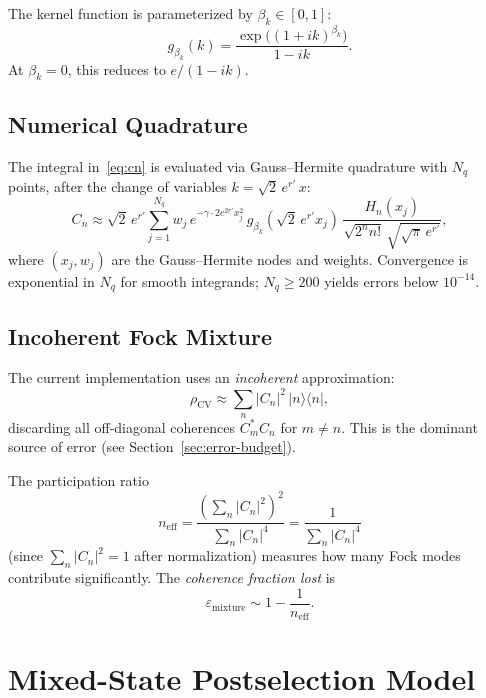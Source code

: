 \documentclass[11pt]{article}
\newcommand{\ket}[1]{|{#1}\rangle}
\newcommand{\bra}[1]{\langle{#1}|}
\newcommand{\eps}{\varepsilon}
\begin{document}
The kernel function is parameterized by $\beta_k\in[0,1]$:
\begin{equation}\label{eq:kernel}
g_{\beta_k}(k) = \frac{\exp\!\big((1+ik)^{\beta_k}\big)}{1-ik}.
\end{equation}
At $\beta_k=0$, this reduces to $e/(1-ik)$.

\subsection{Numerical Quadrature}
The integral in~\eqref{eq:cn} is evaluated via Gauss--Hermite quadrature with $N_q$ points,
after the change of variables $k = \sqrt{2}\,e^{r'}\,x$:
\begin{equation}
C_n \approx \sqrt{2}\,e^{r'}\sum_{j=1}^{N_q} w_j\,
  e^{-\gamma\cdot 2e^{2r'}x_j^2}\,g_{\beta_k}(\sqrt{2}\,e^{r'}x_j)\,
  \frac{H_n(x_j)}{\sqrt{2^n n!}\,\sqrt{\sqrt{\pi}\,e^{r'}}},
\end{equation}
where $(x_j, w_j)$ are the Gauss--Hermite nodes and weights.
Convergence is exponential in $N_q$ for smooth integrands; $N_q\geq 200$ yields
errors below $10^{-14}$.

\subsection{Incoherent Fock Mixture}
The current implementation uses an \emph{incoherent} approximation:
\begin{equation}\label{eq:mixture}
\rho_{\mathrm{CV}} \approx \sum_n |C_n|^2\,\ket{n}\!\bra{n},
\end{equation}
discarding all off-diagonal coherences $C_m^* C_n$ for $m\neq n$.
This is the dominant source of error (see Section~\ref{sec:error-budget}).

The participation ratio
\begin{equation}\label{eq:neff}
n_{\mathrm{eff}} = \frac{\left(\sum_n |C_n|^2\right)^2}{\sum_n |C_n|^4}
  = \frac{1}{\sum_n |C_n|^4}
\end{equation}
(since $\sum_n |C_n|^2=1$ after normalization) measures how many Fock modes
contribute significantly.  The \emph{coherence fraction lost} is
\begin{equation}
\eps_{\mathrm{mixture}} \sim 1 - \frac{1}{n_{\mathrm{eff}}}.
\end{equation}

\section{Mixed-State Postselection Model}
\end{document}
